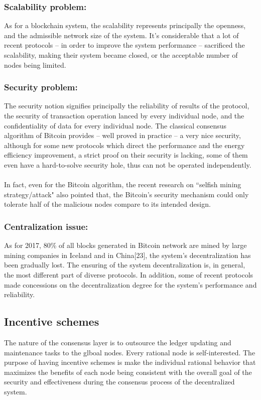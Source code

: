 \documentclass[doublespacing]{bmcart}
\begin{document}
\begin{CJK*}{UTF8}{gbsn}
\subsubsection*{Scalability problem:}	  As for a blockchain system, the scalability represents principally the openness, and the admissible network size of the system. It’s considerable that a lot of recent protocols – in order to improve the system performance – sacrificed the scalability, making their system became closed, or the acceptable number of nodes being limited. 
\subsubsection*{Security problem:} The security notion signifies principally the reliability of results of the protocol, the security of transaction operation lanced by every individual node, and the confidentiality of data for every individual node. The classical consensus algorithm of Bitcoin provides – well proved in practice – a very nice security, although for some new protocols which direct the performance and the energy efficiency improvement, a strict proof on their security is lacking, some of them even have a hard-to-solve security hole, thus can not be operated independently.
\paragraph{}
	In fact, even for the Bitcoin algorithm, the recent research on ``selfish mining strategy/attack" also pointed that, the Bitcoin’s security mechanism could only tolerate half of 
the malicious nodes compare to its intended design.
\subsubsection*{Centralization issue:}
 As for 2017, 80\% of all blocks generated in Bitcoin network are mined by large mining companies in Iceland and in China[23], the system’s decentralization has been gradually lost. The ensuring of the system decentralization is, in general, the most different part of diverse protocols. In addition, some of recent protocols made concessions on the decentralization degree for the system’s performance and reliability.
\subsection{Incentive schemes}
The nature of the consensus layer is to outsource the ledger updating and maintenance tasks to the glboal nodes. Every rational node is self-interested. The purpose of having incentive schemes is make the individual rational behavior that maximizes the benefits of each node being consistent with the overall goal of the security and effectiveness during the consensus process of the decentralized system.

\end{CJK*}
\end{document}

